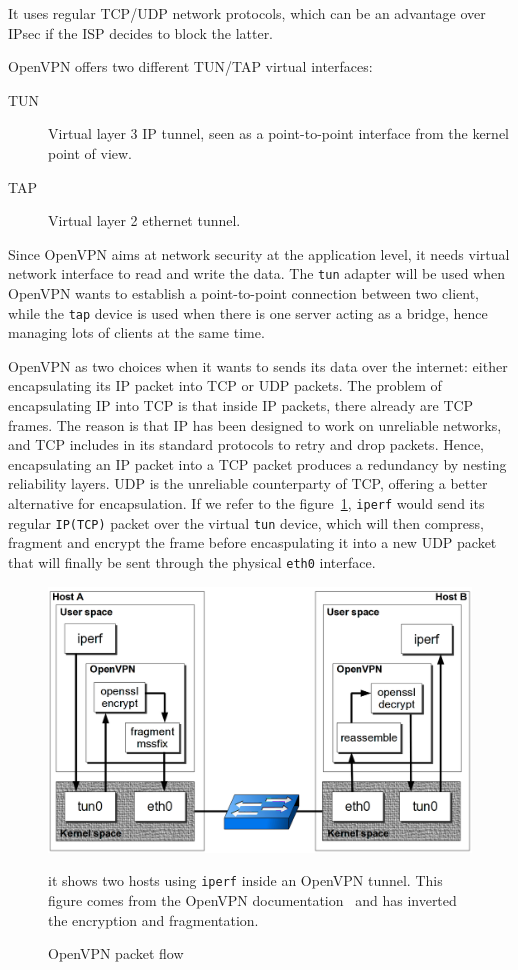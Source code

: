 It uses regular TCP/UDP network protocols, which can be an advantage over IPsec if the ISP decides to block the latter.

OpenVPN offers two different TUN/TAP virtual interfaces:
\begin{description}
	\item[TUN] Virtual layer 3 IP tunnel, seen as a point-to-point interface from the kernel point of view.
	\item[TAP] Virtual layer 2 ethernet tunnel.
\end{description}

Since OpenVPN aims at network security at the application level, it needs virtual network interface to read and write the data.
The \texttt{tun} adapter will be used when OpenVPN wants to establish a point-to-point connection between two client, while the \texttt{tap} device is used when there is one server acting as a bridge, hence managing lots of clients at the same time.

OpenVPN as two choices when it wants to sends its data over the internet: either encapsulating its IP packet into TCP or UDP packets.
The problem of encapsulating IP into TCP is that inside IP packets, there already are TCP frames.
The reason is that IP has been designed to work on unreliable networks, and TCP includes in its standard protocols to retry and drop packets.
Hence, encapsulating an IP packet into a TCP packet produces a redundancy by nesting reliability layers.
UDP is the unreliable counterparty of TCP, offering a better alternative for encapsulation.
If we refer to the figure~\ref{fig:openvpn-packet-flow}, \texttt{iperf} would send its regular \texttt{IP(TCP)} packet over the virtual \texttt{tun} device, which will then compress, fragment and encrypt the frame before encaspulating it into a new UDP packet that will finally be sent through the physical \texttt{eth0} interface.

\begin{figure}[ht]
\includegraphics[width=\textwidth]{OpenVPN-packetflow}
\caption{OpenVPN packet flow}{it shows two hosts using \texttt{iperf} inside an OpenVPN tunnel. This figure comes from the OpenVPN documentation~\cite{openvpn-doc-workflow} and has inverted the encryption and fragmentation.}
\label{fig:openvpn-packet-flow}
\end{figure}

